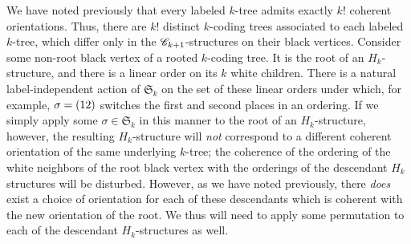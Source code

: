 \documentclass[sectionflow,singlespace,twoside,boldmathhdr]{brandiss} %
\numberwithin{section}{chapter}
\numberwithin{figure}{chapter}
\begin{document}
We have noted previously that every labeled $k$-tree admits exactly $k!$ coherent orientations.
Thus, there are $k!$ distinct $k$-coding trees associated to each labeled $k$-tree, which differ only in the $\mathscr{C}_{k+1}$-structures on their black vertices.
Consider some non-root black vertex of a rooted $k$-coding tree.
It is the root of an $H_{k}$-structure, and there is a linear order on its $k$ white children.
There is a natural label-independent action of $\mathfrak{S}_{k}$ on the set of these linear orders under which, for example, $\sigma = \left( {1 2} \right)$ switches the first and second places in an ordering.
If we simply apply some $\sigma \in \mathfrak{S}_{k}$ in this manner to the root of an $H_{k}$-structure, however, the resulting $H_{k}$-structure will \emph{not} correspond to a different coherent orientation of the same underlying $k$-tree; the coherence of the ordering of the white neighbors of the root black vertex with the orderings of the descendant $H_{k}$ structures will be disturbed.
However, as we have noted previously, there \emph{does} exist a choice of orientation for each of these descendants which is coherent with the new orientation of the root.
We thus will need to apply some permutation to each of the descendant $H_{k}$-structures as well.
\end{document}
